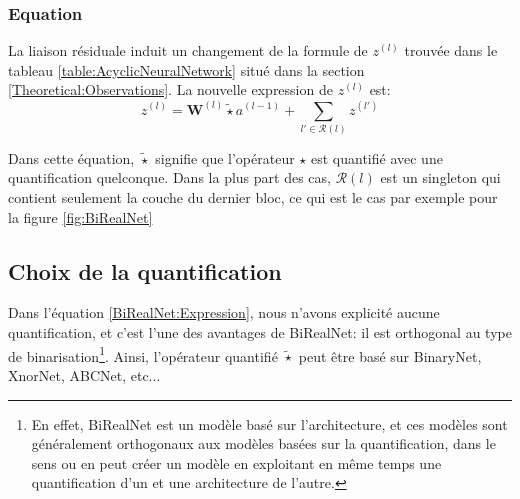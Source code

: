 \subsubsection{Equation}
La liaison résiduale induit un changement de la formule de $z^{(l)}$ trouvée dans le tableau \ref{table:AcyclicNeuralNetwork} situé dans la section \ref{Theoretical:Observations}. La nouvelle expression de $z^{(l)}$ est:
\begin{equation}\label{BiRealNet:Expression}
	z^{(l)}=\boldsymbol{W}^{(l)}\tilde{\star} a^{(l-1)}+\sum_{l' \in \mathcal{R}(l)}z^{(l')}
\end{equation}

Dans cette équation, $\tilde{\star}$ signifie que l'opérateur $\star$ est quantifié avec une quantification quelconque.
Dans la plus part des cas, $\mathcal{R}(l)$ est un singleton qui contient seulement la couche du dernier bloc, ce qui est le cas par exemple pour la figure \ref{fig:BiRealNet}

\subsection{Choix de la quantification}
Dans l'équation \eqref{BiRealNet:Expression}, nous n'avons explicité aucune quantification, et c'est l'une des avantages de BiRealNet: il est orthogonal au type de binarisation\footnote{En effet, BiRealNet est un modèle basé sur l'architecture, et ces modèles sont généralement orthogonaux aux modèles basées sur la quantification, dans le sens ou en peut créer un modèle en exploitant en même temps une quantification d'un et une architecture de l'autre.}.
\newline Ainsi, l'opérateur quantifié $\tilde{\star}$ peut être basé sur BinaryNet, XnorNet, ABCNet, etc...